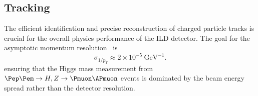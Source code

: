\newcommand{\rmsn}{\mathrm{rms}_{90}}

\subsection{Tracking}\label{sec:performance:tracking}

The efficient identification and precise reconstruction of charged particle
tracks is crucial for the overall physics performance of the ILD detector.
The goal for the asymptotic momentum resolution~\cite{ild:bib:perfgoal::barklow} is
\begin{equation*}
\sigma_{1/p_T} \approx 2\times 10^{-5}~\text{GeV}^{-1}.
\end{equation*}
ensuring that the Higgs mass measurement from $\Pep\Pem \rightarrow H, Z\rightarrow\Pmuon\APmuon$ events
is dominated by the beam energy spread rather than the detector resolution.

